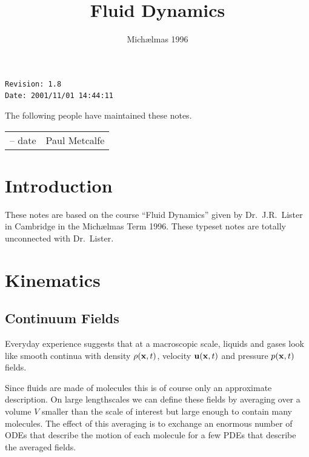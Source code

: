 \documentclass{notes}
\begin{document}
\frontmatter
\title{Fluid Dynamics}
\date{Mich\ae lmas 1996} \maketitle

\thispagestyle{empty}

\noindent\verb$Revision: 1.8 $\hfill\\
\noindent\verb$Date: 2001/11/01 14:44:11 $\hfill\

\vspace{1.5in}

The following people have maintained these notes.

\begin{center}
\begin{tabular}{ r  l}
-- date & Paul Metcalfe
\end{tabular}
\end{center}

\tableofcontents

\chapter{Introduction}

These notes are based on the course ``Fluid Dynamics'' given by
Dr.~J.R.~Lister in Cambridge in the Mich\ae lmas Term 1996.  These
typeset notes are totally unconnected with Dr.~Lister.

\alsoavailable
\archimcopyright

\mainmatter

\chapter{Kinematics}

\section{Continuum Fields}

Everyday experience suggests that at a macroscopic scale, liquids and
gases look like smooth continua with density $\rho(\mathbf{x},t)$, velocity
$\mathbf{u}(\mathbf{x},t)$ and pressure $p(\mathbf{x},t)$ fields.

Since fluids are made of molecules this is of course only an
approximate description.  On large lengthscales we can define these
fields by averaging over a volume $V$ smaller than the scale of
interest but large enough to contain many molecules.  The effect of
this averaging is to exchange an enormous number of ODEs that describe
the motion of each molecule for a few PDEs that describe the averaged
fields.
\end{document}
